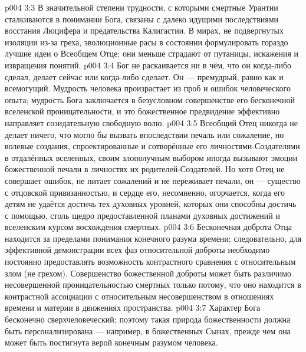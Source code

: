 \vs p004 3:3 \pc В значительной степени трудности, с которыми смертные Урантии сталкиваются в понимании Бога, связаны с далеко идущими последствиями восстания Люцифера и предательства Калигастии. В мирах, не подвергнутых изоляции из\hyp{}за греха, эволюционные расы в состоянии формулировать гораздо лучшие идеи о Всеобщем Отце; они меньше страдают от путаницы, искажения и извращения понятий.
\vs p004 3:4 \pc Бог не раскаивается ни в чём, что он когда\hyp{}либо сделал, делает сейчас или когда\hyp{}либо сделает. Он --- премудрый, равно как и всемогущий. Мудрость человека произрастает из проб и ошибок человеческого опыта; мудрость Бога заключается в безусловном совершенстве его бесконечной вселенской проницательности, и это божественное предвидение эффективно направляет созидательную свободную волю.
\vs p004 3:5 Всеобщий Отец никогда не делает ничего, что могло бы вызвать впоследствии печаль или сожаление, но волевые создания, спроектированные и сотворённые его личностями\hyp{}Создателями в отдалённых вселенных, своим злополучным выбором иногда вызывают эмоции божественной печали в личностях их родителей\hyp{}Создателей. Но хотя Отец не совершает ошибок, не питает сожалений и не переживает печали, он --- существо с отцовской привязанностью, и сердце его, несомненно, огорчается, когда его детям не удаётся достичь тех духовных уровней, которых они способны достичь с помощью, столь щедро предоставленной планами духовных достижений и вселенским курсом восхождения смертных.
\vs p004 3:6 Бесконечная доброта Отца находится за пределами понимания конечного разума времени; следовательно, для эффективной демонстрации всех фаз относительной доброты необходимо постоянно предоставлять возможность контрастного сравнения с относительным злом (не грехом). Совершенство божественной доброты может быть различимо несовершенной проницательностью смертных только потому, что оно находится в контрастной ассоциации с относительным несовершенством в отношениях времени и материи в движениях пространства.
\vs p004 3:7 Характер Бога бесконечно сверхчеловеческий; поэтому такая природа божественности должна быть персонализирована --- например, в божественных Сынах, прежде чем она может быть постигнута верой конечным разумом человека.
